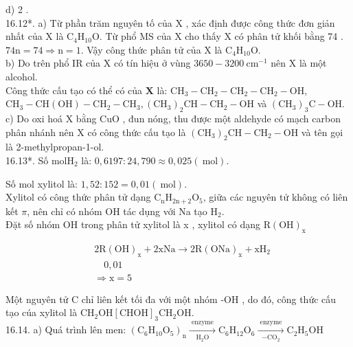 \documentclass[10pt]{article}
\begin{document}
d) 2 .\\
16.12*. a) Từ phần trăm nguyên tố của X , xác định được công thức đơn giản nhất của X là $\mathrm{C}_{4} \mathrm{H}_{10} \mathrm{O}$. Từ phổ MS của X cho thấy X có phân tử khối bằng 74 . $74 \mathrm{n}=74 \Rightarrow \mathrm{n}=1$. Vậy công thức phân tử của X là $\mathrm{C}_{4} \mathrm{H}_{10} \mathrm{O}$.\\
b) Do trên phổ IR của X có tín hiệu ở vùng $3650-3200 \mathrm{~cm}^{-1}$ nên X là một alcohol.\\
Công thức cấu tạo có thể có của $\mathbf{X}$ là: $\mathrm{CH}_{3}-\mathrm{CH}_{2}-\mathrm{CH}_{2}-\mathrm{CH}_{2}-\mathrm{OH}$, $\mathrm{CH}_{3}-\mathrm{CH}(\mathrm{OH})-\mathrm{CH}_{2}-\mathrm{CH}_{3},\left(\mathrm{CH}_{3}\right)_{2} \mathrm{CH}-\mathrm{CH}_{2}-\mathrm{OH}$ và $\left(\mathrm{CH}_{3}\right)_{3} \mathrm{C}-\mathrm{OH}$.\\
c) Do oxi hoá X bằng CuO , đun nóng, thu được một aldehyde có mạch carbon phân nhánh nên X có công thức cấu tạo là $\left(\mathrm{CH}_{3}\right)_{2} \mathrm{CH}-\mathrm{CH}_{2}-\mathrm{OH}$ và tên gọi là 2-methylpropan-1-ol.\\
16.13*. Số $\mathrm{mol} \mathrm{H}_{2}$ là: $0,6197: 24,790 \approx 0,025(\mathrm{~mol})$.

Số mol xylitol là: $1,52: 152=0,01(\mathrm{~mol})$.\\
Xylitol có công thức phân tử dạng $\mathrm{C}_{\mathrm{n}} \mathrm{H}_{2 \mathrm{n}+2} \mathrm{O}_{5}$, giữa các nguyên tử không có liên kết $\pi$, nên chỉ có nhóm OH tác dụng với Na tạo $\mathrm{H}_{2}$.\\
Đặt số nhóm OH trong phân tử xylitol là x , xylitol có dạng $\mathrm{R}(\mathrm{OH})_{\mathrm{x}}$

$$
\begin{aligned}
& 2 \mathrm{R}(\mathrm{OH})_{\mathrm{x}}+2 \mathrm{xNa} \longrightarrow 2 \mathrm{R}(\mathrm{ONa})_{\mathrm{x}}+\mathrm{xH}_{2} \\
& \quad 0,01 \\
& \Rightarrow \mathrm{x}=5
\end{aligned}
$$

Một nguyên tử C chỉ liên kết tối đa với một nhóm -OH , do đó, công thức cấu tạo cúa xylitol là $\mathrm{CH}_{2} \mathrm{OH}[\mathrm{CHOH}]_{3} \mathrm{CH}_{2} \mathrm{OH}$.\\
16.14. a) Quá trình lên men: $\left(\mathrm{C}_{6} \mathrm{H}_{10} \mathrm{O}_{5}\right)_{\mathrm{n}} \xrightarrow[\mathrm{H}_{2} \mathrm{O}]{\text { enzyme }} \mathrm{C}_{6} \mathrm{H}_{12} \mathrm{O}_{6} \xrightarrow[-\mathrm{CO}_{2}]{\text { enzyme }} \mathrm{C}_{2} \mathrm{H}_{5} \mathrm{OH}$
\end{document}
